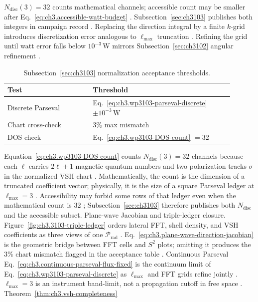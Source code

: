 \(N_{\mathrm{disc}}(3)=32\) counts mathematical channels; accessible count may be smaller after
Eq.~\eqref{eq:ch3.accessible-watt-budget} \cite{harrington2001}. Subsection~\ref{sec:ch3103} publishes both integers in
campaign record \cite{hansen1988}.
Replacing the direction integral by a finite \(k\)-grid introduces discretization error analogous to \(\ell_{\max}\) truncation
\cite{jackson1999}. Refining the grid until watt error falls below \(10^{-3}\,\mathrm{W}\) mirrors
Subsection~\ref{sec:ch3102} angular refinement \cite{hansen1988}.
\begin{table}[t]
\centering
\caption{Subsection~\ref{sec:ch3103} normalization acceptance thresholds.}
\label{tab:ch3.3103-acceptance}
\small
\begin{tabular}{@{}p{0.34\linewidth}p{0.56\linewidth}@{}}
\toprule
Test & Threshold \\
\midrule
Discrete Parseval & Eq.~\eqref{eq:ch3.wp3103-parseval-discrete} $\pm10^{-3}\,\mathrm{W}$ \\
Chart cross-check & $3\%$ max mismatch \\
DOS check & Eq.~\eqref{eq:ch3.wp3103-DOS-count} $=32$ \\
\bottomrule
\end{tabular}
\end{table}
Equation~\eqref{eq:ch3.wp3103-DOS-count} counts \(N_{\mathrm{disc}}(3)=32\) channels because each \(\ell\) carries \(2\ell+1\) magnetic
quantum numbers and two polarization tracks \(\sigma\) in the normalized VSH chart \cite{hansen1988}. Mathematically, the count is
the dimension of a truncated coefficient vector; physically, it is the size of a square Parseval ledger at \(\ell_{\max}=3\)
\cite{harrington2001}. Accessibility may forbid some rows of that ledger even when the mathematical count is \(32\)
\cite{harrington2001}; Subsection~\ref{sec:ch3103} therefore publishes both \(N_{\mathrm{disc}}\) and the accessible subset.
Plane-wave Jacobian and triple-ledger closure. Figure~\ref{fig:ch3.3103-triple-ledger} orders lateral FFT, shell density, and VSH coefficients as three views of one \(\mathcal{P}_{\mathrm{rad}}\)
\cite{jackson1999}. Eq.~\eqref{eq:ch3.plane-wave-direction-jacobian} is the geometric bridge between FFT cells and \(S^{2}\) plots;
omitting it produces the \(3\%\) chart mismatch flagged in the acceptance table \cite{stratton1941}. Continuous Parseval
Eq.~\eqref{eq:ch3.continuous-parseval-flux-fixed} is the continuum limit of Eq.~\eqref{eq:ch3.wp3103-parseval-discrete} as \(\ell_{\max}\) and
FFT grids refine jointly \cite{kato1995}.
\(\ell_{\max}=3\) is an instrument band-limit, not a propagation cutoff in free space \cite{jackson1999}. Theorem~\ref{thm:ch3.vsh-completeness}

